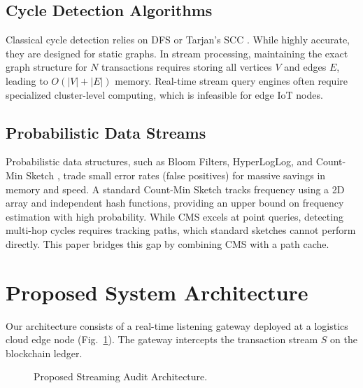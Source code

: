 \documentclass[conference]{IEEEtran}
\begin{document}
\subsection{Cycle Detection Algorithms}
Classical cycle detection relies on DFS or Tarjan's SCC \cite{b8}. While highly accurate, they are designed for static graphs. In stream processing, maintaining the exact graph structure for $N$ transactions requires storing all vertices $V$ and edges $E$, leading to $O(|V| + |E|)$ memory. Real-time stream query engines often require specialized cluster-level computing, which is infeasible for edge IoT nodes.

\subsection{Probabilistic Data Streams}
Probabilistic data structures, such as Bloom Filters, HyperLogLog, and Count-Min Sketch \cite{b3}, trade small error rates (false positives) for massive savings in memory and speed. A standard Count-Min Sketch tracks frequency using a 2D array and independent hash functions, providing an upper bound on frequency estimation with high probability. While CMS excels at point queries, detecting multi-hop cycles requires tracking paths, which standard sketches cannot perform directly. This paper bridges this gap by combining CMS with a path cache.

\section{Proposed System Architecture}
Our architecture consists of a real-time listening gateway deployed at a logistics cloud edge node (Fig.~\ref{fig_arch}). The gateway intercepts the transaction stream $S$ on the blockchain ledger. 

\begin{figure}[htbp]
\centering
{}
\caption{Proposed Streaming Audit Architecture.}
\label{fig_arch}
\end{figure}
\end{document}
